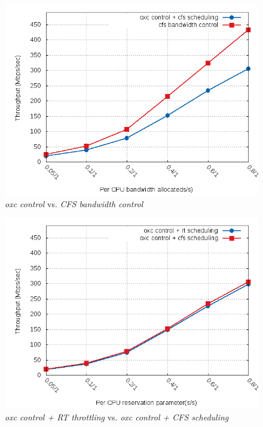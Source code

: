 \begin{figure}[htbp]
        \centering
        \includegraphics[width=\textwidth, totalheight=0.4\textheight]{images/expB2}
        \caption{\emph{oxc control} vs. \emph{CFS bandwidth control}}
        \label{fig:expB2}
\end{figure}
\begin{figure}[htbp]
        \centering
        \includegraphics[width=\textwidth, totalheight=0.4\textheight]{images/expB3}
        \caption{\emph{oxc control + RT throttling} vs. \emph{oxc control + CFS scheduling}}
        \label{fig:expB3}
\end{figure}

